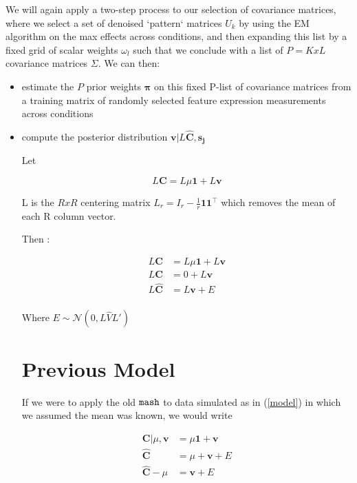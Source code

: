 \documentclass[11pt, oneside]{article}   	%
\newcommand{\Norm}{{\mathcal{N}}} %
\newcommand{\ceff}{\bm{C}}
\newcommand{\chat}{\bm{\hat{C}}}
\newcommand{\vb}{\bm{v}}
\def\mash{{\tt mash}}
\begin{document}
We will again apply a two-step process to our selection of covariance matrices, where we select a set of denoised `pattern` matrices $U_{k}$ by using the EM algorithm on the max effects across conditions,
and then expanding this list by a fixed grid of scalar weights $\omega_{l}$ such that we conclude with a list of $P=KxL$ covariance matrices $\Sigma$. We can then:
\begin{itemize}
\item estimate the $P$ prior weights $\bm\pi$ on this fixed P-list of covariance matrices from a training matrix of randomly selected feature expression measurements across conditions
\item compute the posterior distribution $\vb | L \chat, \bm{s_{j}}$

Let 

\begin{equation}
L \ceff = L \mu \bm{1} + L \vb
\end{equation}

L is the $RxR$ centering matrix $L_{r}=I_{r}-{\tfrac  {1}{r}}{\mathbf  {1}}{\mathbf  {1}}^{\top }$ which removes the mean of each R column vector.

Then :

\begin{equation}
\label{model}
\begin{aligned}
L \ceff &= L \mu \bm{1}+ L \vb \\
L \ceff &= 0 + L \vb \\
L \chat &= L \vb + E \\
\end{aligned}
\end{equation}



Where $E \sim \Norm (0, L\hat{V} L')$


\section{Previous Model}

If we were to apply the old $\mash$ to data simulated as in (\ref{model}) in which we assumed the mean was known, we would write

\begin{equation}
\label{mashmodel}
\begin{aligned}
\ceff | \mu, \vb  &= \mu \bm{1} + \vb \\
\chat &= \mu + \vb + E \\
\chat - \mu &= \vb + E \\
\end{aligned}
\end{equation}


\end{itemize}
\end{document}

